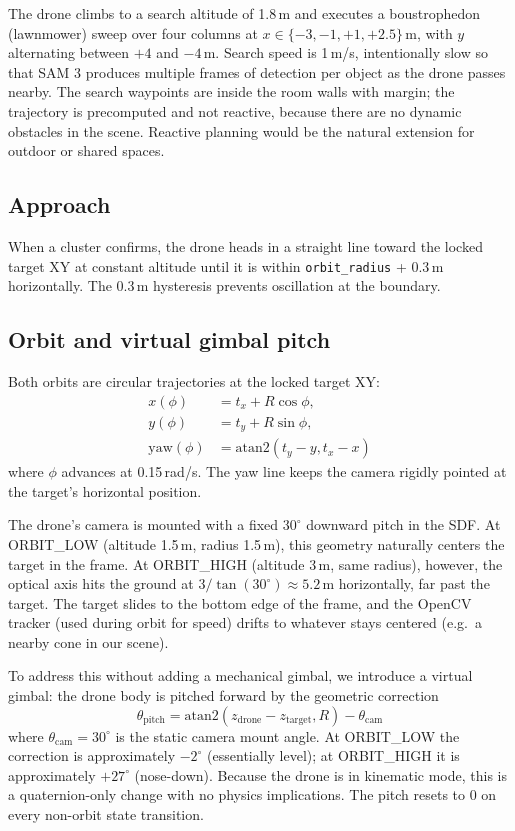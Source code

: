 \documentclass[conference]{IEEEtran}
\begin{document}
The drone climbs to a search altitude of 1.8\,m and executes a
boustrophedon (lawnmower) sweep over four columns at
$x\in\{-3, -1, +1, +2.5\}$\,m, with $y$ alternating between
$+4$ and $-4$\,m. Search speed is 1\,m/s, intentionally slow so
that SAM 3 produces multiple frames of detection per object as the
drone passes nearby. The search waypoints are inside the room
walls with margin; the trajectory is precomputed and not reactive,
because there are no dynamic obstacles in the scene. Reactive
planning would be the natural extension for outdoor or shared
spaces.

\subsection{Approach}

When a cluster confirms, the drone heads in a straight line toward
the locked target XY at constant altitude until it is within
\texttt{orbit\_radius} + 0.3\,m horizontally. The 0.3\,m hysteresis
prevents oscillation at the boundary.

\subsection{Orbit and virtual gimbal pitch}

Both orbits are circular trajectories at the locked target XY:
\begin{equation}
\begin{aligned}
x(\phi) &= t_x + R\cos\phi, \\
y(\phi) &= t_y + R\sin\phi, \\
\text{yaw}(\phi) &= \mathrm{atan2}(t_y - y, t_x - x)
\end{aligned}
\label{eq:orbit}
\end{equation}
where $\phi$ advances at 0.15\,rad/s. The yaw line keeps the camera
rigidly pointed at the target's horizontal position.

The drone's camera is mounted with a fixed $30^{\circ}$ downward
pitch in the SDF. At ORBIT\_LOW (altitude 1.5\,m, radius
1.5\,m), this geometry naturally centers the target in the frame.
At ORBIT\_HIGH (altitude 3\,m, same radius), however, the optical
axis hits the ground at $3 / \tan(30^{\circ}) \approx 5.2$\,m
horizontally, far past the target. The target slides to the
bottom edge of the frame, and the OpenCV tracker (used during
orbit for speed) drifts to whatever stays centered (e.g.~a
nearby cone in our scene).

To address this without adding a mechanical gimbal, we introduce
a virtual gimbal: the drone body is pitched forward by the
geometric correction
\begin{equation}
\theta_{\text{pitch}} =
\mathrm{atan2}(z_{\text{drone}} - z_{\text{target}}, R)
- \theta_{\text{cam}}
\label{eq:gimbal}
\end{equation}
where $\theta_{\text{cam}} = 30^{\circ}$ is the static camera
mount angle. At ORBIT\_LOW the correction is approximately
$-2^{\circ}$ (essentially level); at ORBIT\_HIGH it is
approximately $+27^{\circ}$ (nose-down). Because the drone is
in kinematic mode, this is a quaternion-only change with no
physics implications. The pitch resets to 0 on every
non-orbit state transition.
\end{document}
